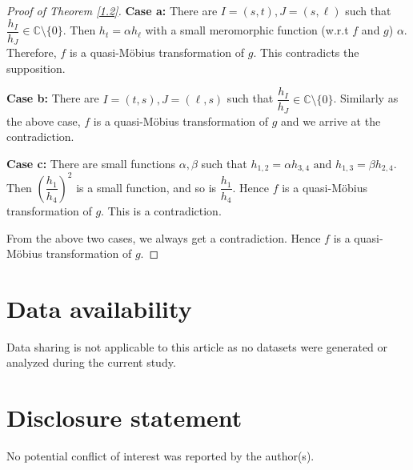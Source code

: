 \documentclass[12pt,leqno]{amsart}
\newcommand{\C}{{\mathbb{C}}}
\numberwithin{equation}{section}
\begin{document}
\begin{proof}[Proof of Theorem \ref{1.2}]
\textbf{Case a:} There are $I=(s,t), J=(s,\ell)$ such that $\dfrac{h_I}{h_J}\in\C\setminus\{0\}$. Then $h_t=\alpha h_\ell$ with a small meromorphic function (w.r.t $f$ and $g$) $\alpha$. Therefore, $f$ is a quasi-M\"{o}bius  transformation of $g$. This contradicts the supposition.

\textbf{Case b:} There are $I=(t,s), J=(\ell,s)$ such that $\dfrac{h_I}{h_J}\in\C\setminus\{0\}$.  Similarly as the above case, $f$ is a quasi-M\"{o}bius  transformation of $g$ and we arrive at the contradiction. 

\textbf{Case c:} There are small functions $\alpha,\beta$ such that $h_{1,2}=\alpha h_{3,4}\text{ and } h_{1,3}=\beta h_{2,4}.$
Then $\left(\dfrac{h_1}{h_4}\right)^{2}$ is a small function, and so is $\dfrac{h_1}{h_4}$. Hence $f$ is a quasi-M\"{o}bius transformation of $g$. This is a contradiction.

From the above two cases, we always get a contradiction. Hence $f$ is a quasi-M\"{o}bius transformation of $g$. 
\end{proof}

\section*{Data availability}
Data sharing is not applicable to this article as no datasets were generated or analyzed during the current study.

\section*{Disclosure statement}
No potential conflict of interest was reported by the author(s).
\end{document}
